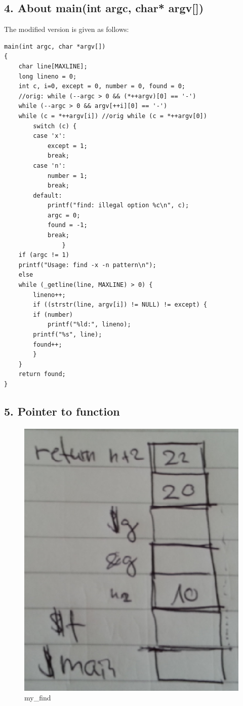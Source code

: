 \documentclass[12pt]{article}
\begin{document}
\subsection*{4. About main(int argc, char* argv[])}
The modified version is given as follows:
\begin{lstlisting}
main(int argc, char *argv[])
{
    char line[MAXLINE];
    long lineno = 0;
    int c, i=0, except = 0, number = 0, found = 0;
    //orig: while (--argc > 0 && (*++argv)[0] == '-')
    while (--argc > 0 && argv[++i][0] == '-')
	while (c = *++argv[i]) //orig while (c = *++argv[0])
	    switch (c) {
		case 'x':
		    except = 1;
		    break;
		case 'n':
		    number = 1;
		    break;
		default:
		    printf("find: illegal option %c\n", c);
		    argc = 0;
		    found = -1;
		    break;
				}
    if (argc != 1)
	printf("Usage: find -x -n pattern\n");
    else
	while (_getline(line, MAXLINE) > 0) {
	    lineno++;
	    if ((strstr(line, argv[i]) != NULL) != except) {
		if (number)
		    printf("%ld:", lineno);
		printf("%s", line);
		found++;
	    }
	}
    return found;
}
\end{lstlisting}

\subsection*{5. Pointer to function }
\begin{figure}[!htb]
\centering
\includegraphics[scale=0.5]{eps/5.eps}  
\caption{my\_find}
\end{figure}
\end{document}
